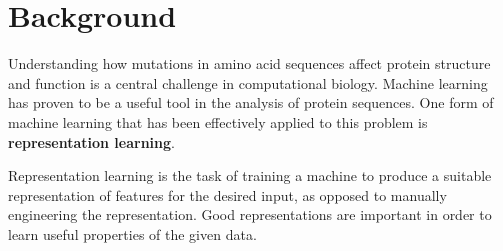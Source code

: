 








\section*{Background}
Understanding how mutations in amino acid sequences affect protein structure and function is a central challenge in computational biology. Machine learning has proven to be a useful tool in the analysis of protein sequences. One form of machine learning that has been effectively applied to this problem is \textbf{representation learning}.

Representation learning is the task of training a machine to produce a suitable representation of features for the desired input, as opposed to manually engineering the representation. Good representations are important in order to learn useful properties of the given data.

